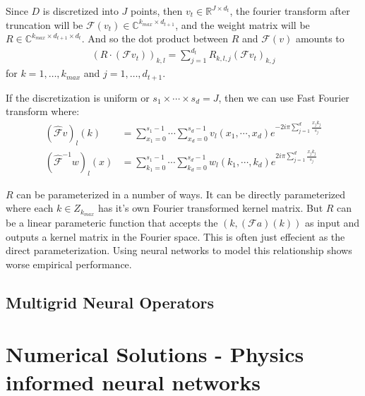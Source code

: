 \documentclass[12pt]{article}
\begin{document}
Since $D$ is discretized into $J$ points, then $v_t \in \mathbb{R}^{J \times d_{t}}$, the fourier transform after truncation will be $\mathcal{F}(v_t) \in \mathbb{C}^{k_{max} \times d_{t + 1}}$, and the weight matrix will be $R \in \mathbb{C}^{k_{max} \times d_{t + 1}\times d_{t}}$. And so the dot product between $R$ and $\mathcal{F}(v)$ amounts to
\begin{align*}
    (R\cdot (\mathcal{F}v_t))_{k, l} = \sum_{j =1}^{d_t} R_{k, l, j}(\mathcal{F}v_t)_{k, j}
\end{align*}
for $k = 1, \ldots, k_{max}$ and $j = 1, \ldots, d_{t + 1}$.

If the discretization is uniform or $s_1 \times \cdots \times s_d = J$, then we can use Fast Fourier transform where:
\begin{align*}
    (\widehat{\mathcal{F}} v)_l(k) &= \sum_{x_1 = 0}^{s_1 - 1} \cdots \sum_{x_d = 0}^{s_d - 1} v_l(x_1, \cdots, x_d)e^{-2i\pi \sum_{j = 1}^d \frac{x_jk_j}{s_j}} \\
    (\widehat{\mathcal{F}}^{-1} w)_l(x) &= \sum_{k_1 = 0}^{s_1 - 1} \cdots \sum_{k_d = 0}^{s_d - 1} w_l(k_1, \cdots, k_d)e^{2i\pi \sum_{j = 1}^d \frac{x_jk_j}{s_j}}
\end{align*}

$R$ can be parameterized in a number of ways. It can be directly parameterized where each $k \in Z_{k_{max}}$ has it's own Fourier transformed kernel matrix. But $R$ can be a linear parameteric function that accepts the $(k, (\mathcal{F}a)(k))$ as input and outputs a kernel matrix in the Fourier space. This is often just effecient as the direct parameterization. Using neural networks to model this relationship shows worse empirical performance. 

\subsection{Multigrid Neural Operators}

\section{Numerical Solutions - Physics informed neural networks}
 
\end{document}
